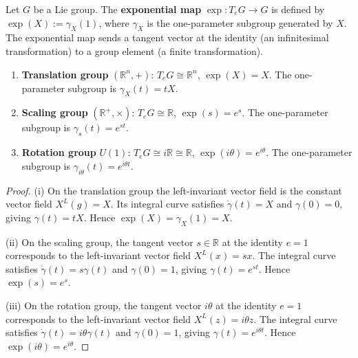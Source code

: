 \begin{definition}\label{def:exponential_map}
Let $G$ be a Lie group. The \textbf{exponential map} $\exp: T_eG \to G$ is defined by $\exp(X) := \gamma_X(1)$, where $\gamma_X$ is the one-parameter subgroup generated by $X$. The exponential map sends a tangent vector at the identity (an infinitesimal transformation) to a group element (a finite transformation).
\end{definition}

\begin{proposition}\label{prop:three_exponential_maps}
\begin{enumerate}[label=(\roman*)]
    \item \textbf{Translation group} $(\mathbb{R}^n, +)$: $T_eG \cong \mathbb{R}^n$, $\exp(X) = X$. The one-parameter subgroup is $\gamma_X(t) = tX$.
    \item \textbf{Scaling group} $(\mathbb{R}^+, \times)$: $T_eG \cong \mathbb{R}$, $\exp(s) = e^s$. The one-parameter subgroup is $\gamma_s(t) = e^{st}$.
    \item \textbf{Rotation group} $U(1)$: $T_eG \cong i\mathbb{R} \cong \mathbb{R}$, $\exp(i\theta) = e^{i\theta}$. The one-parameter subgroup is $\gamma_{i\theta}(t) = e^{i\theta t}$.
\end{enumerate}
\end{proposition}

\begin{proof}
(i) On the translation group the left-invariant vector field is the constant vector field $X^L(g) = X$. Its integral curve satisfies $\dot{\gamma}(t) = X$ and $\gamma(0) = 0$, giving $\gamma(t) = tX$. Hence $\exp(X) = \gamma_X(1) = X$.

(ii) On the scaling group, the tangent vector $s \in \mathbb{R}$ at the identity $e = 1$ corresponds to the left-invariant vector field $X^L(x) = sx$. The integral curve satisfies $\dot{\gamma}(t) = s\gamma(t)$ and $\gamma(0) = 1$, giving $\gamma(t) = e^{st}$. Hence $\exp(s) = e^s$.

(iii) On the rotation group, the tangent vector $i\theta$ at the identity $e = 1$ corresponds to the left-invariant vector field $X^L(z) = i\theta z$. The integral curve satisfies $\dot{\gamma}(t) = i\theta\gamma(t)$ and $\gamma(0) = 1$, giving $\gamma(t) = e^{i\theta t}$. Hence $\exp(i\theta) = e^{i\theta}$.
\end{proof}

